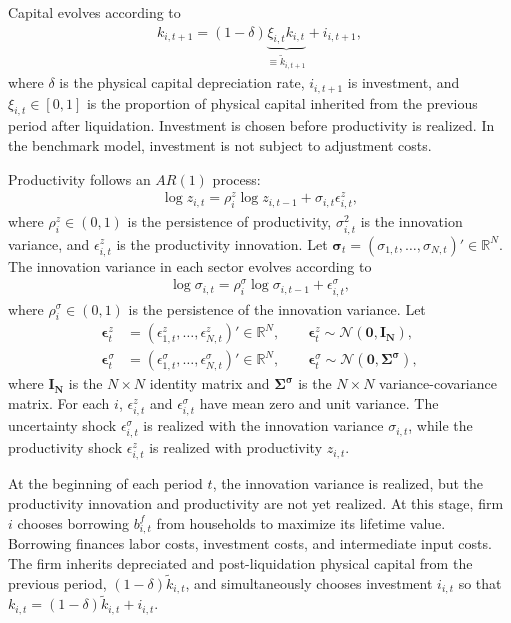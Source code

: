 \documentclass[12pt]{article}
\numberwithin{equation}{section}
\begin{document}
Capital evolves according to
\begin{align}\label{eq:capital_accumulation}
    k_{i,t+1}
    = (1-\delta) \underbrace{\xi_{i,t} k_{i,t}}_{\equiv \tilde{k}_{i,t+1}} + i_{i,t+1},
\end{align}
where $\delta$ is the physical capital depreciation rate, $i_{i,t+1}$ is investment, and $\xi_{i,t}\in[0,1]$ is the proportion of physical capital inherited from the previous period after liquidation. Investment is chosen before productivity is realized. In the benchmark model, investment is not subject to adjustment costs.

Productivity follows an $AR(1)$ process:
\begin{align}\label{eq:productivity_process}
    \log z_{i,t}
    = \rho^z_{i} \log z_{i,t-1}
    +\sigma_{i,t}\epsilon^z_{i,t},
\end{align}
where $\rho^z_{i}\in(0,1)$ is the persistence of productivity, $\sigma_{i,t}^2$ is the innovation variance, and $\epsilon^z_{i,t}$ is the productivity innovation. Let $\boldsymbol \sigma_t = (\sigma_{1,t},\ldots,\sigma_{N,t})'\in \mathbb{R}^N$. The innovation variance in each sector evolves according to
\begin{align}\label{eq:innovation_variance_process}
    \log \sigma_{i,t} = \rho^\sigma_{i} \log \sigma_{i,t-1} + \epsilon^\sigma_{i,t},
\end{align}
where $\rho^\sigma_{i}\in(0,1)$ is the persistence of the innovation variance. Let
\begin{align*}
    \boldsymbol\epsilon^z_t
    &=
    (\epsilon^z_{1,t},\ldots,\epsilon^z_{N,t})'\in \mathbb{R}^N,
    \qquad
    \boldsymbol\epsilon^z_t
    \sim
    \mathcal N(\mathbf 0, \mathbf{I_N}), \\
    \boldsymbol\epsilon^\sigma_t
    &=
    (\epsilon^\sigma_{1,t},\ldots,\epsilon^\sigma_{N,t})'\in \mathbb{R}^N,
    \qquad
    \boldsymbol\epsilon^\sigma_t
    \sim
    \mathcal N(\mathbf 0, \mathbf{\Sigma^\sigma}),
\end{align*}
where $\mathbf{I_N}$ is the $N\times N$ identity matrix and $\mathbf{\Sigma^\sigma}$ is the $N\times N$ variance-covariance matrix. For each $i$, $\epsilon^z_{i,t}$ and $\epsilon^\sigma_{i,t}$ have mean zero and unit variance. The uncertainty shock $\epsilon^\sigma_{i,t}$ is realized with the innovation variance $\sigma_{i,t}$, while the productivity shock $\epsilon^z_{i,t}$ is realized with productivity $z_{i,t}$.



At the beginning of each period $t$, the innovation variance is realized, but the productivity innovation and productivity are not yet realized. At this stage, firm $i$ chooses borrowing $b^f_{i,t}$ from households to maximize its lifetime value. Borrowing finances labor costs, investment costs, and intermediate input costs. The firm inherits depreciated and post-liquidation physical capital from the previous period, $(1-\delta)\tilde{k}_{i,t}$, and simultaneously chooses investment $i_{i,t}$ so that $k_{i,t} = (1-\delta) \tilde{k}_{i,t} + i_{i,t}$.
\end{document}
